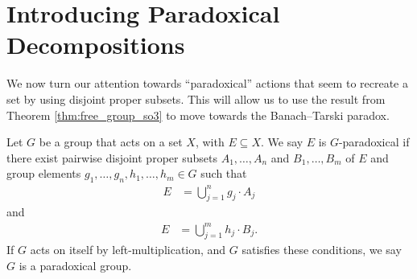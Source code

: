 \section{Introducing Paradoxical Decompositions}\label{sec:intro_paradoxical_decompositions}%
We now turn our attention towards ``paradoxical'' actions that seem to recreate a set by using disjoint proper subsets. This will allow us to use the result from Theorem \ref{thm:free_group_so3} to move towards the Banach--Tarski paradox.
\begin{definition}
  Let $G$ be a group that acts on a set $X$, with $E\subseteq X$. We say $E$ is $G${-paradoxical} if there exist pairwise disjoint proper subsets $A_1,\dots,A_n$ and $B_1,\dots,B_m$ of $E$ and group elements $g_1,\dots,g_n,h_1,\dots,h_m\in G$ such that
  \begin{align*}
    E &= \bigcup_{j=1}^{n}g_j\cdot A_j
  \end{align*}
  and
  \begin{align*}
    E &= \bigcup_{j=1}^{m}h_j\cdot B_j.
  \end{align*}
  If $G$ acts on itself by left-multiplication, and $G$ satisfies these conditions, we say $G$ is a {paradoxical group}.
\end{definition}
